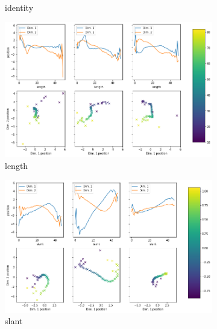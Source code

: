 \documentclass[11pt,a4paper]{article}
\begin{document}
\begin{figure}[H]
\begin{subfigure}{.48\textwidth}
\caption{identity}
\end{subfigure}
\hfill
\begin{subfigure}{.48\textwidth}
\includegraphics[width=\textwidth]{images/latent_space_traversals/vlae_gan_mnist_morpho_latent_space_values_length.png}
\caption{length}
\end{subfigure}
\begin{subfigure}{.48\textwidth}
\includegraphics[width=\textwidth]{images/latent_space_traversals/vlae_gan_mnist_morpho_latent_space_values_slant.png}
\caption{slant}
\end{subfigure}
\hfill
\begin{subfigure}{.48\textwidth}

\end{subfigure}
\end{figure}
\end{document}
